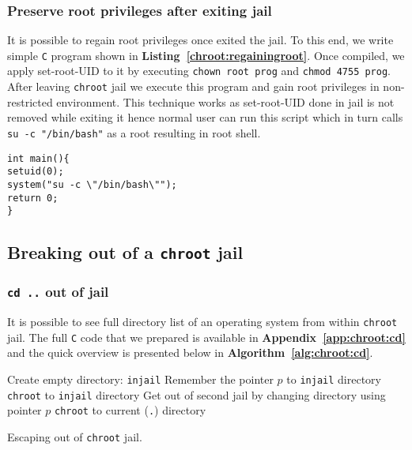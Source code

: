 \documentclass[12pt, a4paper, pdflatex]{article}
\begin{document}
\subsubsection{Preserve root privileges after exiting jail}
It is possible to regain root privileges once exited the jail. To this end, we write simple \texttt{C} program shown in \textbf{Listing~\ref{chroot:regainingroot}}. Once compiled, we apply set-root-UID to it by executing \texttt{chown root prog} and \texttt{chmod 4755 prog}.\\
After leaving \texttt{chroot} jail we execute this program and gain root privileges in non-restricted environment. This technique works as set-root-UID done in jail is not removed while exiting it hence normal user can run this script which in turn calls \texttt{su -c "/bin/bash"} as a root resulting in root shell.

\vspace{1em}
\begin{lstlisting}
int main(){
setuid(0);
system("su -c \"/bin/bash\"");
return 0;
}
\end{lstlisting}

\subsection{Breaking out of a \texttt{chroot} jail}
\subsubsection{\texttt{cd ..} out of jail}
It is possible to see full directory list of an operating system from within \texttt{chroot} jail. The full \texttt{C} code that we prepared is available in \textbf{Appendix~\ref{app:chroot:cd}} and the quick overview is presented below in \textbf{Algorithm~\ref{alg:chroot:cd}}.


\SetAlCapSkip{1em}
\LinesNumbered
{}
\vspace{1em}
\begin{algorithm}[h]
  Create empty directory: \texttt{injail}\;
  Remember the pointer $p$ to \texttt{injail} directory\;
  \texttt{chroot} to \texttt{injail} directory\;
  Get out of second jail by changing directory using pointer $p$\;
  \texttt{chroot} to current (\texttt{.}) directory\;
  \caption{Escaping out of \texttt{chroot} jail.\label{alg:chroot:cd}}
\end{algorithm}
\vspace{1em}
\end{document}
